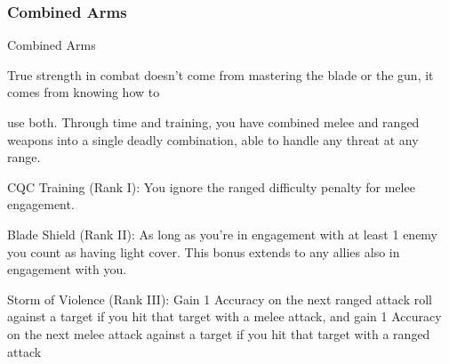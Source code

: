 \subsubsection{Combined Arms}

                                             Combined Arms

True strength in combat doesn’t come from mastering the blade or the gun, it comes from knowing how to

use both. Through time and training, you have combined melee and ranged weapons into a single deadly
combination, able to handle any threat at any range.

CQC Training (Rank I): You ignore the ranged difficulty penalty for melee engagement.

Blade Shield (Rank II): As long as you’re in engagement with at least 1 enemy you count as
having light cover. This bonus extends to any allies also in engagement with you.

Storm of Violence (Rank III): Gain 1 Accuracy on the next ranged attack roll against a target if
you hit that target with a melee attack, and gain 1 Accuracy on the next melee attack against a
target if you hit that target with a ranged attack